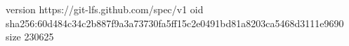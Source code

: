 version https://git-lfs.github.com/spec/v1
oid sha256:60d484c34c2b887f9a3a73730fa5ff15c2e0491bd81a8203ca5468d3111e9690
size 230625
